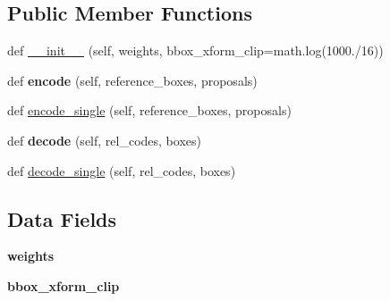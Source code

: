 \subsection*{Public Member Functions}
\begin{DoxyCompactItemize}
\item 
def \hyperlink{classtorchvision_1_1models_1_1detection_1_1__utils_1_1BoxCoder_afc43f91e5715c33f0a579cb6771e264e}{\+\_\+\+\_\+init\+\_\+\+\_\+} (self, weights, bbox\+\_\+xform\+\_\+clip=math.\+log(1000./16))
\item 
\mbox{\label{classtorchvision_1_1models_1_1detection_1_1__utils_1_1BoxCoder_acacc7a9c412911049ccb9fa4086ebe83}} 
def {\bfseries encode} (self, reference\+\_\+boxes, proposals)
\item 
def \hyperlink{classtorchvision_1_1models_1_1detection_1_1__utils_1_1BoxCoder_a99b12af811b1fe21fb43c7b14777a1c2}{encode\+\_\+single} (self, reference\+\_\+boxes, proposals)
\item 
\mbox{\label{classtorchvision_1_1models_1_1detection_1_1__utils_1_1BoxCoder_a9c5ce4848954cf62ad493e7bc88e0e18}} 
def {\bfseries decode} (self, rel\+\_\+codes, boxes)
\item 
def \hyperlink{classtorchvision_1_1models_1_1detection_1_1__utils_1_1BoxCoder_a5f74461c2eba449973824f777a948aec}{decode\+\_\+single} (self, rel\+\_\+codes, boxes)
\end{DoxyCompactItemize}
\subsection*{Data Fields}
\begin{DoxyCompactItemize}
\item 
\mbox{\label{classtorchvision_1_1models_1_1detection_1_1__utils_1_1BoxCoder_ad3b45e2695c6ec89b720871fdb782b21}} 
{\bfseries weights}
\item 
\mbox{\label{classtorchvision_1_1models_1_1detection_1_1__utils_1_1BoxCoder_a1a48ae67b94cb32a26cc55fc863ecd14}} 
{\bfseries bbox\+\_\+xform\+\_\+clip}
\end{DoxyCompactItemize}


